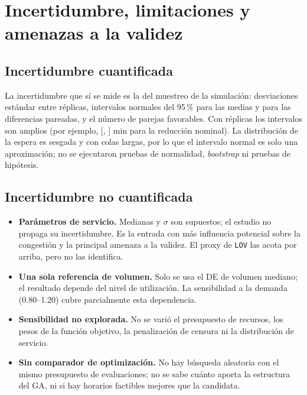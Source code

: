 \section{Incertidumbre, limitaciones y amenazas a la validez}
\label{sec:incertidumbre}

\subsection{Incertidumbre cuantificada}
La incertidumbre que sí se mide es la del muestreo de la simulación: desviaciones estándar
entre réplicas, intervalos normales del 95\,\% para las medias y para las diferencias
pareadas, y el número de parejas favorables. Con \NReps{} réplicas los intervalos son
amplios (por ejemplo, [\RedCILowNom, \RedCIHighNom] min para la reducción nominal). La
distribución de la espera es sesgada y con colas largas, por lo que el intervalo normal es
solo una aproximación; no se ejecutaron pruebas de normalidad, \emph{bootstrap} ni pruebas
de hipótesis.

\subsection{Incertidumbre no cuantificada}
\begin{itemize}
  \item \textbf{Parámetros de servicio.} Medianas y $\sigma$ son supuestos; el estudio no
  propaga su incertidumbre. Es la entrada con más influencia potencial sobre la congestión y
  la principal amenaza a la validez. El proxy de \texttt{LOV} las acota por arriba, pero no
  las identifica.
  \item \textbf{Una sola referencia de volumen.} Solo se usa el DE de volumen mediano; el
  resultado depende del nivel de utilización. La sensibilidad a la demanda
  (0.80--1.20) cubre parcialmente esta dependencia.
  \item \textbf{Sensibilidad no explorada.} No se varió el presupuesto de recursos, los
  pesos de la función objetivo, la penalización de censura ni la distribución de servicio.
  \item \textbf{Sin comparador de optimización.} No hay búsqueda aleatoria con el mismo
  presupuesto de evaluaciones; no se sabe cuánto aporta la estructura del GA, ni si hay
  horarios factibles mejores que la candidata.
\end{itemize}


